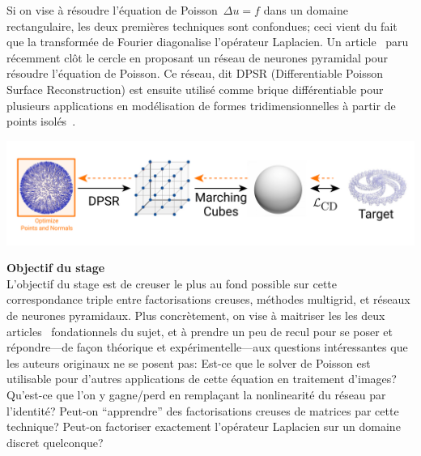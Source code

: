 \documentclass[a4paper,11pt]{article}
\begin{document}
Si on vise à résoudre l'équation de Poisson~$\Delta u = f$ dans un domaine
rectangulaire, les deux premières techniques sont confondues; ceci vient du
fait que la transformée de Fourier diagonalise l'opérateur Laplacien.
Un article~\cite{sap} paru récemment
clôt le cercle en proposant un réseau
de neurones pyramidal pour résoudre l'équation de Poisson.
Ce réseau, dit DPSR (Differentiable Poisson Surface Reconstruction) est ensuite
utilisé comme brique différentiable pour plusieurs applications en modélisation
de formes tridimensionnelles à partir de points isolés~\cite{psr}.
\\
\centerline{%
	\includegraphics[width=0.8\linewidth]{f/pipeline_optim.png}%
}



{\bf Objectif du stage}\\
L'objectif du stage est de creuser le plus au fond possible sur cette
correspondance triple entre factorisations creuses, méthodes multigrid, et
réseaux de neurones pyramidaux.  Plus concrètement, on vise à maitriser les les
deux articles~\cite{psr,sap} fondationnels du sujet, et à prendre un peu de
recul pour se poser et répondre---de façon théorique et expérimentelle---aux
questions intéressantes que les auteurs originaux ne se posent pas:
Est-ce que le solver de Poisson est utilisable pour d'autres applications de
cette équation en traitement d'images?  Qu'est-ce que l'on y gagne/perd en
remplaçant la nonlinearité du réseau par l'identité? Peut-on ``apprendre'' des
factorisations creuses de matrices par cette technique?  Peut-on factoriser
exactement l'opérateur Laplacien sur un domaine discret quelconque?
\end{document}
